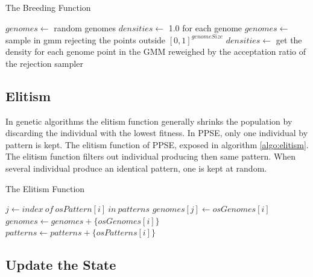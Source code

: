 \documentclass[10pt,letterpaper]{article}
\theoremstyle{definition}
\theoremstyle{remark}
\begin{document}
\begin{algorithm}
    \caption{The Breeding Function}
    \label{algo:breeding}
    \begin{algorithmic}[1]
        \State $genomes \gets$ random genomes
        \State $densities \gets$ 1.0 for each genome
        \Else
        \State $genomes \gets$ sample in gmm rejecting the points outside $[0, 1]^{genomeSize}$
        \State $densities \gets$ get the density for each genome point in the GMM reweighed by the acceptation ratio of the rejection sampler 
        \EndIf
        \State {}
    \EndFunction    
    \end{algorithmic}
\end{algorithm}


\subsection*{Elitism}

In genetic algorithms the elitism function generally shrinks the population by discarding the individual with the lowest fitness.
In PPSE, only one individual by pattern is kept. The elitism function of PPSE, exposed in algorithm \ref{algo:elitism}. The elitism function filters out individual producing then same pattern. When several individual produce an identical pattern, one is kept at random.

\begin{algorithm}
    \caption{The Elitism Function}
    \label{algo:elitism}
    \begin{algorithmic}[1]
        \State $j \gets index\ of\ osPattern[i]\ in\ patterns$
        \State $genomes[j] \gets osGenomes[i]$
      \EndIf
    \Else
    \State $genomes \gets genomes + \{osGenomes[i]\}$
    \State $patterns \gets patterns + \{osPatterns[i]\}$
    \EndIf
    \EndFor
    \State {}
    \EndFunction
    \end{algorithmic}
\end{algorithm}


\subsection{Update the State}
\end{document}

